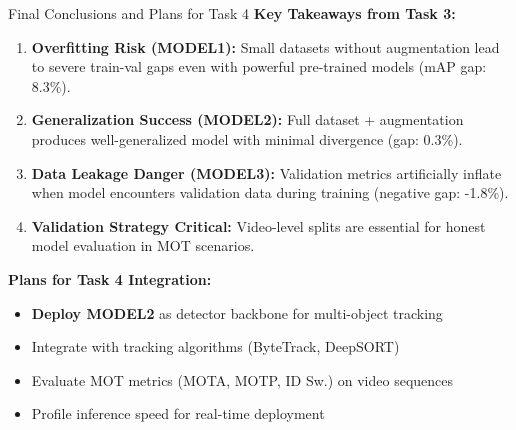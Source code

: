 \documentclass{beamer}
\begin{document}
\begin{frame}{Final Conclusions and Plans for Task 4}
    \textbf{Key Takeaways from Task 3:}
    
    \begin{enumerate}
        \item \textbf{Overfitting Risk (MODEL1):} Small datasets without augmentation lead to severe train-val gaps even with powerful pre-trained models (mAP gap: 8.3\%).
        
        \item \textbf{Generalization Success (MODEL2):} Full dataset + augmentation produces well-generalized model with minimal divergence (gap: 0.3\%).
        
        \item \textbf{Data Leakage Danger (MODEL3):} Validation metrics artificially inflate when model encounters validation data during training (negative gap: -1.8\%).
        
        \item \textbf{Validation Strategy Critical:} Video-level splits are essential for honest model evaluation in MOT scenarios.
    \end{enumerate}

    \vspace{0.3cm}
    \textbf{Plans for Task 4 Integration:}
    \begin{itemize}
        \item \textbf{Deploy MODEL2} as detector backbone for multi-object tracking
        \item Integrate with tracking algorithms (ByteTrack, DeepSORT)
        \item Evaluate MOT metrics (MOTA, MOTP, ID Sw.) on video sequences
        \item Profile inference speed for real-time deployment
    \end{itemize}
\end{frame}
\end{document}
